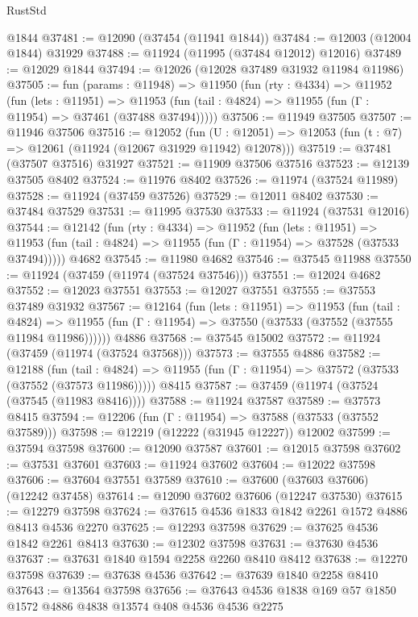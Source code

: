 \begin{lexlean}{RustStd}
\begin{coremodule}
    @1844
@37481 := @12090 (@37454 (@11941 @1844))
@37484 := @12003 (@12004 @1844) @31929
@37488 := @11924 (@11995 (@37484 @12012) @12016)
@37489 := @12029 @1844
@37494 := @12026 (@12028 @37489 @31932 @11984 @11986)
@37505 := fun (params : @11948) =>
  @11950
    (fun (rty : @4334) =>
    @11952
      (fun (lets : @11951) =>
      @11953 (fun (tail : @4824) => @11955 (fun (Γ : @11954) => @37461 (@37488 @37494)))))
@37506 := @11949 @37505
@37507 := @11946 @37506
@37516 := @12052
    (fun (U : @12051) => @12053 (fun (t : @7) => @12061 (@11924 (@12067 @31929 @11942) @12078)))
@37519 := @37481 (@37507 @37516) @31927
@37521 := @11909 @37506 @37516
@37523 := @12139 @37505 @8402
@37524 := @11976 @8402
@37526 := @11974 (@37524 @11989)
@37528 := @11924 (@37459 @37526)
@37529 := @12011 @8402
@37530 := @37484 @37529
@37531 := @11995 @37530
@37533 := @11924 (@37531 @12016)
@37544 := @12142
    (fun (rty : @4334) =>
    @11952
      (fun (lets : @11951) =>
      @11953 (fun (tail : @4824) => @11955 (fun (Γ : @11954) => @37528 (@37533 @37494)))))
    @4682
@37545 := @11980 @4682
@37546 := @37545 @11988
@37550 := @11924 (@37459 (@11974 (@37524 @37546)))
@37551 := @12024 @4682
@37552 := @12023 @37551
@37553 := @12027 @37551
@37555 := @37553 @37489 @31932
@37567 := @12164
    (fun (lets : @11951) =>
    @11953
      (fun (tail : @4824) =>
      @11955 (fun (Γ : @11954) => @37550 (@37533 (@37552 (@37555 @11984 @11986))))))
    @4886
@37568 := @37545 @15002
@37572 := @11924 (@37459 (@11974 (@37524 @37568)))
@37573 := @37555 @4886
@37582 := @12188
    (fun (tail : @4824) => @11955 (fun (Γ : @11954) => @37572 (@37533 (@37552 (@37573 @11986)))))
    @8415
@37587 := @37459 (@11974 (@37524 (@37545 (@11983 @8416))))
@37588 := @11924 @37587
@37589 := @37573 @8415
@37594 := @12206 (fun (Γ : @11954) => @37588 (@37533 (@37552 @37589)))
@37598 := @12219 (@12222 (@31945 @12227)) @12002
@37599 := @37594 @37598
@37600 := @12090 @37587
@37601 := @12015 @37598
@37602 := @37531 @37601
@37603 := @11924 @37602
@37604 := @12022 @37598
@37606 := @37604 @37551 @37589
@37610 := @37600 (@37603 @37606) (@12242 @37458)
@37614 := @12090 @37602 @37606 (@12247 @37530)
@37615 := @12279 @37598
@37624 := @37615 @4536 @1833 @1842 @2261 @1572 @4886 @8413 @4536 @2270
@37625 := @12293 @37598
@37629 := @37625 @4536 @1842 @2261 @8413
@37630 := @12302 @37598
@37631 := @37630 @4536
@37637 := @37631 @1840 @1594 @2258 @2260 @8410 @8412
@37638 := @12270 @37598
@37639 := @37638 @4536
@37642 := @37639 @1840 @2258 @8410
@37643 := @13564 @37598
@37656 := @37643 @4536 @1838 @169 @57 @1850 @1572 @4886 @4838 @13574 @408 @4536 @4536 @2275

\end{coremodule}
\end{lexlean}
